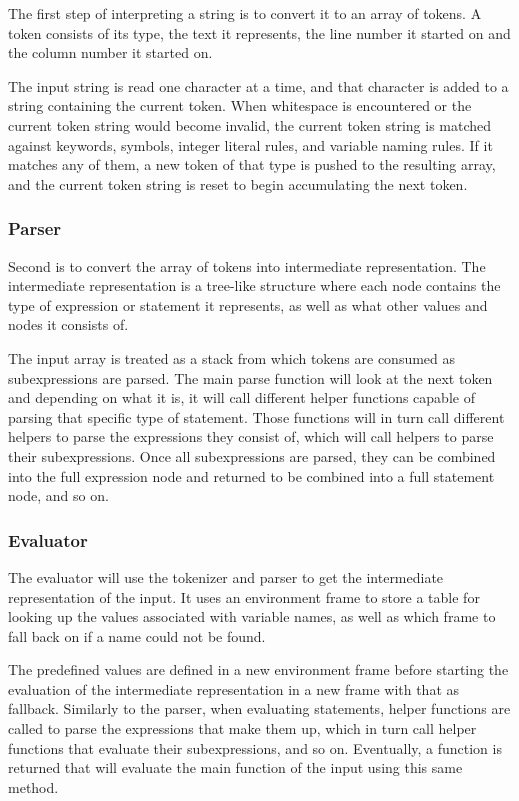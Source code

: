 The first step of interpreting a string is to convert it to an array of tokens. A token consists of its type, the text it represents, the line number it started on and the column number it started on.

The input string is read one character at a time, and that character is added to a string containing the current token. When whitespace is encountered or the current token string would become invalid, the current token string is matched against keywords, symbols, integer literal rules, and variable naming rules. If it matches any of them, a new token of that type is pushed to the resulting array, and the current token string is reset to begin accumulating the next token.

\subsubsection{Parser}

Second is to convert the array of tokens into intermediate representation. The intermediate representation is a tree-like structure where each node contains the type of expression or statement it represents, as well as what other values and nodes it consists of.

The input array is treated as a stack from which tokens are consumed as subexpressions are parsed. The main parse function will look at the next token and depending on what it is, it will call different helper functions capable of parsing that specific type of statement. Those functions will in turn call different helpers to parse the expressions they consist of, which will call helpers to parse their subexpressions. Once all subexpressions are parsed, they can be combined into the full expression node and returned to be combined into a full statement node, and so on.

\subsubsection{Evaluator}

The evaluator will use the tokenizer and parser to get the intermediate representation of the input. It uses an environment frame to store a table for looking up the values associated with variable names, as well as which frame to fall back on if a name could not be found.

The predefined values are defined in a new environment frame before starting the evaluation of the intermediate representation in a new frame with that as fallback. Similarly to the parser, when evaluating statements, helper functions are called to parse the expressions that make them up, which in turn call helper functions that evaluate their subexpressions, and so on. Eventually, a function is returned that will evaluate the main function of the input using this same method.

